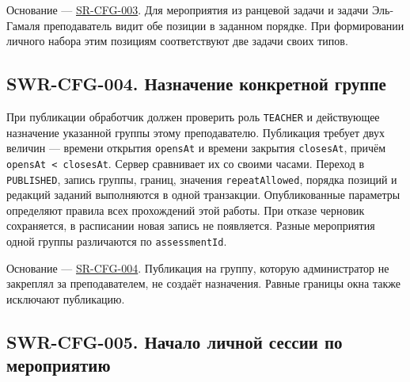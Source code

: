 \documentclass[12pt,a4paper]{article}
\begin{document}
Основание --- {\href{../04\_Системные\_требования/DOC-05\_Системные\_требования.pdf\#sr-cfg-003}{SR-CFG-003}}. Для мероприятия из ранцевой задачи и задачи Эль-Гамаля преподаватель видит обе позиции в заданном порядке. При формировании личного набора этим позициям соответствуют две задачи своих типов.

\subsection{SWR-CFG-004. Назначение конкретной группе}\label{swr-cfg-004-ux43dux430ux437ux43dux430ux447ux435ux43dux438ux435-ux43aux43eux43dux43aux440ux435ux442ux43dux43eux439-ux433ux440ux443ux43fux43fux435}

\hypertarget{swr-cfg-004-назначение-конкретной-группе}{}

\hypertarget{swr-cfg-004}{}

При публикации обработчик должен проверить роль \texttt{TEACHER} и действующее назначение указанной группы этому преподавателю. Публикация требует двух величин --- времени открытия \texttt{opensAt} и времени закрытия \texttt{closesAt}, причём \texttt{opens\allowbreak{}At < closes\allowbreak{}At}. Сервер сравнивает их со своими часами. Переход в \texttt{PUBLISHED}, запись группы, границ, значения \texttt{repeat\allowbreak{}Allowed}, порядка позиций и редакций заданий выполняются в одной транзакции. Опубликованные параметры определяют правила всех прохождений этой работы. При отказе черновик сохраняется, в расписании новая запись не появляется. Разные мероприятия одной группы различаются по \texttt{assessment\allowbreak{}Id}.

Основание --- {\href{../04\_Системные\_требования/DOC-05\_Системные\_требования.pdf\#sr-cfg-004}{SR-CFG-004}}. Публикация на группу, которую администратор не закреплял за преподавателем, не создаёт назначения. Равные границы окна также исключают публикацию.

\subsection{SWR-CFG-005. Начало личной сессии по мероприятию}\label{swr-cfg-005-ux43dux430ux447ux430ux43bux43e-ux43bux438ux447ux43dux43eux439-ux441ux435ux441ux441ux438ux438-ux43fux43e-ux43cux435ux440ux43eux43fux440ux438ux44fux442ux438ux44e}

\hypertarget{swr-cfg-005-начало-личной-сессии-по-мероприятию}{}

\hypertarget{swr-cfg-005}{}
\end{document}
